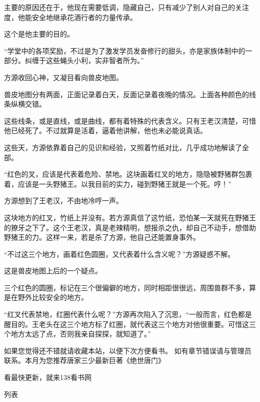 \begin{this_body}
主要的原因还在于，他现在需要低调，隐藏自己，只有减少了别人对自己的关注度，他能安全地继承花酒行者的力量传承。

这个是他主要的目的。

“学堂中的各项奖励，不过是为了激发学员发奋修行的甜头，亦是家族体制中的一部分。纠缠于这些蝇头小利，实非智者所为。”

方源收回心神，又凝目看向兽皮地图。

兽皮地图分有两面，正面记录着白天，反面记录着夜晚的情况。上面各种颜色的线条纵横交错。

这些线条，或是直线，或是曲线，都有着特殊的代表含义。只有王老汉清楚，可惜他已经死了。不过就算是活着，逼着他讲解，他也未必能说真话。

这些天，方源依靠着自己的见识和经验，又照着竹纸对比，几乎成功地解读了全部。

“红色的叉，应该是代表着危险、禁地。这块画着红叉的地方，隐隐被野猪群包裹着，应该是一头野猪王。以我目前的实力，碰到野猪王就是一个死。哼！”

方源想到了王老汉，不由地冷哼一声。

这块地方的红叉，竹纸上并没有。若方源真信了这竹纸，恐怕某一天就死在野猪王的獠牙之下了。这个王老汉，真是老辣精明，想报杀之仇，却自己不动手，想借助野猪王的力。这样一来，若是杀了方源，他自己还能置身事外。

“不过这三个地方，画着红色圆圈，又代表着什么含义呢？”方源疑惑不解。

这是兽皮地图上后的一个疑点。

三个红色的圆圈，标记在三个很偏僻的地方，同时相距很很远，周围兽群不多，算是在野外比较安全的地方。

“红叉代表禁地，红圈代表什么呢？”方源再次陷入了沉思，“一般而言，红色都是醒目的。王老头在这三个地方标了红圈，就代表这三个地方对他很重要。可惜这三个地方太远了点，否则我亲自探探，就知道了。”

如果您觉得还不错就请收藏本站，以便下次方便看书。 如有章节错误请与管理员联系。本月为您推荐唐家三少最新巨著《绝世唐门》

看最快更新，就来138看书网

列表

\end{this_body}

